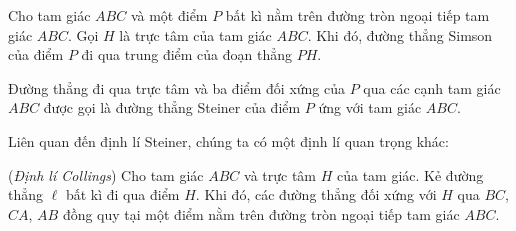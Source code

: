         \begin{property}
            Cho tam giác \(ABC\) và một điểm \(P\) bất kì nằm trên đường tròn ngoại tiếp tam giác \(ABC\). Gọi \(H\) là trực tâm của tam giác \(ABC\). Khi đó, đường thẳng Simson của điểm \(P\) đi qua trung điểm của đoạn thẳng \(PH\).
        \end{property}

        \begin{definition}
            Đường thẳng đi qua trực tâm và ba điểm đối xứng của \(P\) qua các cạnh tam giác \(ABC\) được gọi là đường thẳng Steiner của điểm \(P\) ứng với tam giác \(ABC\).
        \end{definition}

        Liên quan đến định lí Steiner, chúng ta có một định lí quan trọng khác:

        \begin{theorem}
            (\textit{Định lí Collings}) Cho tam giác \(ABC\) và trực tâm \(H\) của tam giác. Kẻ đường thẳng \(\ell\) bất kì đi qua điểm \(H\). Khi đó, các đường thẳng đối xứng với \(H\) qua \(BC\), \(CA\), \(AB\) đồng quy tại một điểm nằm trên đường tròn ngoại tiếp tam giác \(ABC\).
        \end{theorem}

